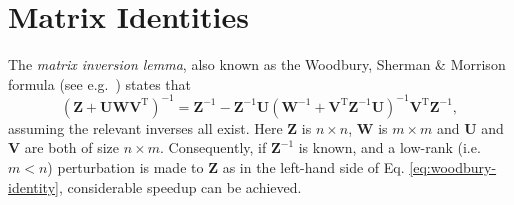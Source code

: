 %
%




\section{Matrix Identities}
\label{sec:matrix-identities}

The \emph{matrix inversion lemma}, also known as the Woodbury, Sherman \& Morrison formula (see e.g.\ \citep[p.~75]{press92}) states that
\begin{equation}
\label{eq:woodbury-identity}
	(\mathbf{Z} + \mathbf{U}\mathbf{W}\mathbf{V}^\text{T})^{-1}
	= \mathbf{Z}^{-1} - \mathbf{Z}^{-1}\mathbf{U}(\mathbf{W}^{-1} + \mathbf{V}^\text{T}\mathbf{Z}^{-1}\mathbf{U})^{-1}\mathbf{V}^\text{T}\mathbf{Z}^{-1},
\end{equation}
assuming the relevant inverses all exist. Here $\mathbf{Z}$ is $n\times n$, $\mathbf{W}$ is $m\times m$ and $\mathbf{U}$ and $\mathbf{V}$ are both of size $n\times m$. Consequently, if $\mathbf{Z}^{-1}$ is known, and a low-rank (i.e.\ $m < n$) perturbation is made to $\mathbf{Z}$ as in the left-hand side of Eq. \eqref{eq:woodbury-identity}, considerable speedup can be achieved.